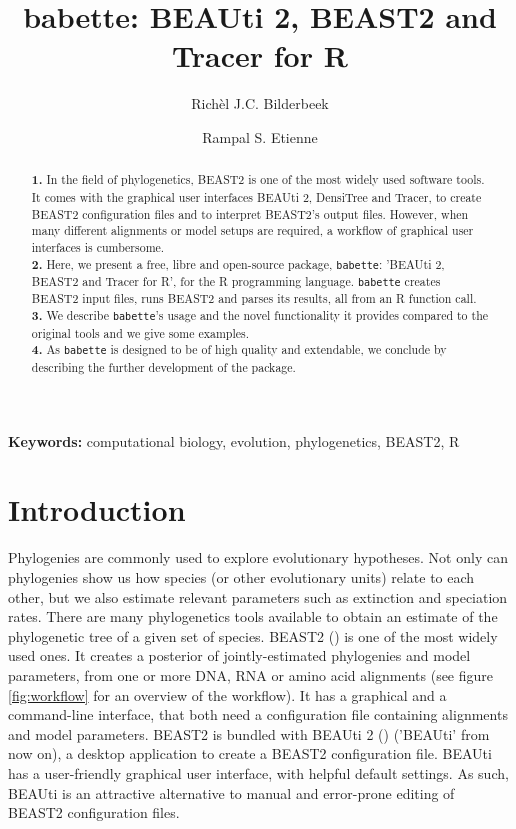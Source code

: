 \documentclass{article}
\title{babette: BEAUti 2, BEAST2 and Tracer for R}
\author[1]{Rich\`el J.C. Bilderbeek}
\author[1]{Rampal S. Etienne}
\affil[1]{Groningen Institute for Evolutionary Life Sciences, University of Groningen, Groningen, The Netherlands}
\begin{document}
\maketitle

\begin{abstract}

  \textbf{1. }
    In the field of phylogenetics, 
    BEAST2 is one of the most widely used software tools. 
    It comes with the graphical user interfaces BEAUti 2, DensiTree and Tracer,
    to create BEAST2 configuration files and to interpret BEAST2's output files. 
    However, when many different alignments or model 
    setups are required, a workflow of graphical user interfaces is cumbersome. \\
  \textbf{2. }
    Here, we present a free, libre and open-source package, \verb;babette;: 
    'BEAUti 2, BEAST2 and Tracer for R', for the R programming language. 
    \verb;babette; creates BEAST2 input files, runs BEAST2 and parses its results, 
    all from an R function call. \\
  \textbf{3. }
    We describe \verb;babette;'s usage and the novel functionality it provides
    compared to the original tools and we give some examples. \\
  \textbf{4. }
    As \verb;babette; is designed to be of high quality and extendable, 
    we conclude by describing the further development of the package. \\
\end{abstract}

{\bf Keywords:} computational biology, evolution, phylogenetics, BEAST2, R

\section{Introduction}

Phylogenies are commonly used to explore evolutionary hypotheses.
Not only can phylogenies show us how species (or other
evolutionary units) relate to each other, 
but we also estimate relevant parameters such as extinction and 
speciation rates.
There are many phylogenetics tools available to obtain an estimate 
of the phylogenetic tree of a given set of species. 
BEAST2 (\cite{bouckaert2014beast}) is one of the most widely used ones. 
It creates a posterior of jointly-estimated phylogenies and model parameters, 
from one or more DNA, RNA or amino acid alignments (see figure \ref{fig:workflow} 
for an overview of the workflow). 
It has a graphical and a command-line interface, 
that both need a configuration file containing 
alignments and model parameters.
BEAST2 is bundled with BEAUti 2 (\cite{drummond2012bayesian}) ('BEAUti' from now on), 
a desktop application to create a BEAST2 configuration file.
BEAUti has a user-friendly graphical user interface, with helpful
default settings.
As such, BEAUti is an attractive alternative 
to manual and error-prone editing of BEAST2 configuration files. 
\end{document}
